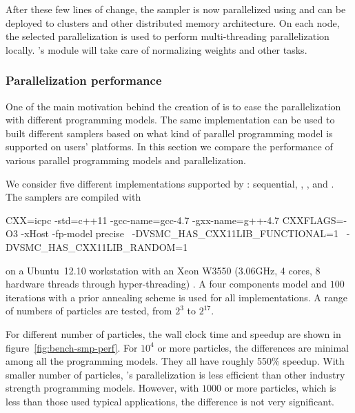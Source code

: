 \documentclass[11pt, fontset=Minion, showoverfull,
bib, mintcode, minted=cache]{marticle}
\begin{document}
After these few lines of change, the sampler is now parallelized using \lmpi
and can be deployed to clusters and other distributed memory architecture. On
each node, the selected \smp parallelization is used to perform
multi-threading parallelization locally. \vsmc's \lmpi module will take care
of normalizing weights and other tasks.

\subsubsection{Parallelization performance}

One of the main motivation behind the creation of \vsmc is to ease the
parallelization with different programming models. The same implementation can
be used to built different samplers based on what kind of parallel programming
model is supported on users' platforms. In this section we compare the
performance of various \smp parallel programming models and \lopencl
parallelization.

We consider five different implementations supported by :
sequential, \ltbb, \lcilk, \lopenmp and \cppoo {}. The
samplers are compiled with
\begin{cppcode}
CXX=icpc -std=c++11 -gcc-name=gcc-4.7 -gxx-name=g++-4.7
CXXFLAGS=-O3 -xHost -fp-model precise  \
         -DVSMC_HAS_CXX11LIB_FUNCTIONAL=1  \
         -DVSMC_HAS_CXX11LIB_RANDOM=1
\end{cppcode}
on a Ubuntu~12.10 workstation with an Xeon W3550 (3.06GHz, 4 cores, 8 hardware
threads through hyper-threading) \cpu. A four components model and $100$
iterations with a prior annealing scheme is used for all implementations. A
range of numbers of particles are tested, from $2^3$ to $2^{17}$.

For different number of particles, the wall clock time and speedup are shown
in figure~\ref{fig:bench-smp-perf}. For $10^4$ or more particles, the
differences are minimal among all the programming models. They all have
roughly 550\% speedup. With smaller number of particles, \vsmc's \cppoo
parallelization is less efficient than other industry strength programming
models. However, with $1000$ or more particles, which is less than those used
typical applications, the difference is not very significant.
\end{document}
